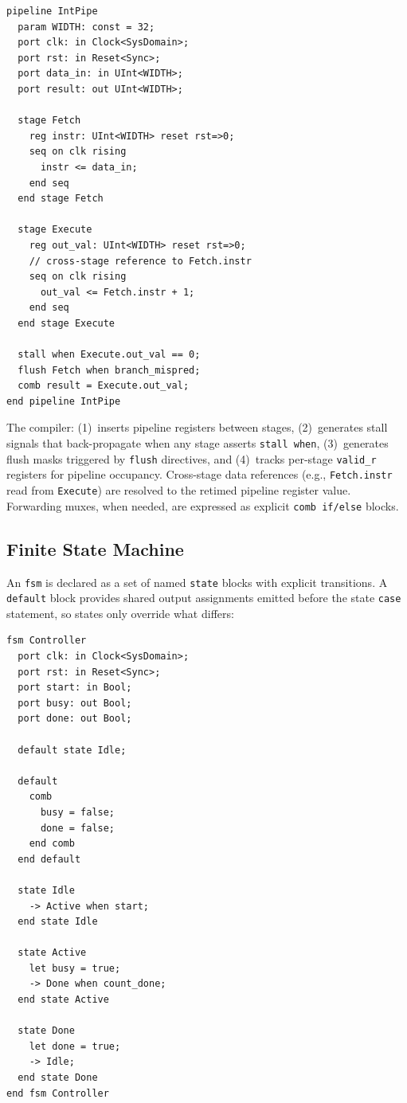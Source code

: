 \documentclass[manuscript]{acmart}
\begin{document}
\begin{lstlisting}[language=Arch,caption={Pipeline with forwarding},label={lst:pipe}]
pipeline IntPipe
  param WIDTH: const = 32;
  port clk: in Clock<SysDomain>;
  port rst: in Reset<Sync>;
  port data_in: in UInt<WIDTH>;
  port result: out UInt<WIDTH>;

  stage Fetch
    reg instr: UInt<WIDTH> reset rst=>0;
    seq on clk rising
      instr <= data_in;
    end seq
  end stage Fetch

  stage Execute
    reg out_val: UInt<WIDTH> reset rst=>0;
    // cross-stage reference to Fetch.instr
    seq on clk rising
      out_val <= Fetch.instr + 1;
    end seq
  end stage Execute

  stall when Execute.out_val == 0;
  flush Fetch when branch_mispred;
  comb result = Execute.out_val;
end pipeline IntPipe
\end{lstlisting}

The compiler:
(1)~inserts pipeline registers between stages,
(2)~generates stall signals that back-propagate when any stage asserts \texttt{stall when},
(3)~generates flush masks triggered by \texttt{flush} directives, and
(4)~tracks per-stage \texttt{valid\_r} registers for pipeline occupancy.
Cross-stage data references (e.g., \texttt{Fetch.instr} read from \texttt{Execute}) are resolved to the retimed pipeline register value. Forwarding muxes, when needed, are expressed as explicit \texttt{comb if/else} blocks.

\subsection{Finite State Machine}

An \texttt{fsm} is declared as a set of named \texttt{state} blocks with explicit transitions. A \texttt{default} block provides shared output assignments emitted before the state \texttt{case} statement, so states only override what differs:

\begin{lstlisting}[language=Arch,caption={FSM with default block and transitions},label={lst:fsm}]
fsm Controller
  port clk: in Clock<SysDomain>;
  port rst: in Reset<Sync>;
  port start: in Bool;
  port busy: out Bool;
  port done: out Bool;

  default state Idle;

  default
    comb
      busy = false;
      done = false;
    end comb
  end default

  state Idle
    -> Active when start;
  end state Idle

  state Active
    let busy = true;
    -> Done when count_done;
  end state Active

  state Done
    let done = true;
    -> Idle;
  end state Done
end fsm Controller
\end{lstlisting}
\end{document}
